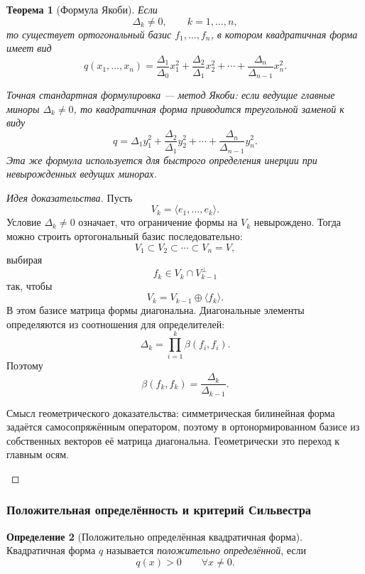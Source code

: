 \documentclass[12pt,a4paper]{article}
\theoremstyle{definition}
\newtheorem{definition}{Определение}[section]
\theoremstyle{plain}
\newtheorem{theorem}[definition]{Теорема}
\theoremstyle{remark}
\newenvironment{knowledgefix}{\begin{clarifybox}}{\end{clarifybox}}
\begin{document}
\begin{theorem}[Формула Якоби]
Если
\[
    \Delta_k\ne0,
    \qquad k=1,\ldots,n,
\]
то существует ортогональный базис $f_1,\ldots,f_n$, в котором квадратичная форма имеет вид
\[
    q(x_1,\ldots,x_n)
    =\frac{\Delta_1}{\Delta_0}x_1^2
    +\frac{\Delta_2}{\Delta_1}x_2^2
    +\cdots+
    \frac{\Delta_n}{\Delta_{n-1}}x_n^2.
\]
\begin{knowledgefix}
Точная стандартная формулировка — метод Якоби: если ведущие главные миноры \(\Delta_k\ne0\), то квадратичная форма приводится треугольной заменой к виду
\[q=\Delta_1 y_1^2+\frac{\Delta_2}{\Delta_1}y_2^2+\cdots+\frac{\Delta_n}{\Delta_{n-1}}y_n^2.\]
Эта же формула используется для быстрого определения инерции при невырожденных ведущих минорах.
\end{knowledgefix}
\end{theorem}

\begin{proof}[Идея доказательства]
Пусть
\[
    V_k=\langle e_1,\ldots,e_k\rangle.
\]
Условие $\Delta_k\ne0$ означает, что ограничение формы на $V_k$ невырождено.
Тогда можно строить ортогональный базис последовательно:
\[
    V_1\subset V_2\subset\cdots\subset V_n=V,
\]
выбирая
\[
    f_k\in V_k\cap V_{k-1}^{\perp}
\]
так, чтобы
\[
    V_k=V_{k-1}\oplus\langle f_k\rangle.
\]
В этом базисе матрица формы диагональна.
Диагональные элементы определяются из соотношения для определителей:
\[
    \Delta_k=\prod_{i=1}^k \beta(f_i,f_i).
\]
Поэтому
\[
    \beta(f_k,f_k)=\frac{\Delta_k}{\Delta_{k-1}}.
\]
\begin{knowledgefix}
Смысл геометрического доказательства: симметрическая билинейная форма задаётся самосопряжённым оператором, поэтому в ортонормированном базисе из собственных векторов её матрица диагональна. Геометрически это переход к главным осям.
\end{knowledgefix}
\end{proof}

\subsubsection*{Положительная определённость и критерий Сильвестра}

\begin{definition}[Положительно определённая квадратичная форма]
Квадратичная форма $q$ называется \emph{положительно определённой}, если
\[
    q(x)>0
    \qquad \forall x\ne0.
\]
\end{definition}
\end{document}
